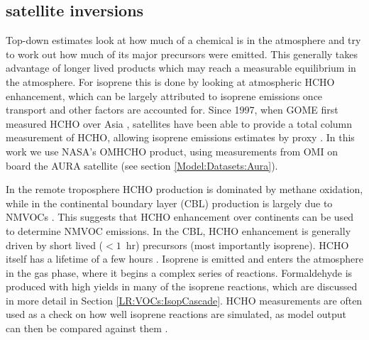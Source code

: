   \subsection{satellite inversions}
    \label{BioIsop:intro:satellite_inversion}
    Top-down estimates look at how much of a chemical is in the atmosphere and try to work out how much of its major precursors were emitted.
    This generally takes advantage of longer lived products which may reach a measurable equilibrium in the atmosphere.
    For isoprene this is done by looking at atmospheric HCHO enhancement, which can be largely attributed to isoprene emissions once transport and other factors are accounted for.
    Since 1997, when GOME first measured HCHO over Asia \parencite{Thomas1998}, satellites have been able to provide a total column measurement of HCHO, allowing isoprene emissions estimates by proxy \parencite{Palmer2001,Bauwens2016}.
    In this work we use NASA's OMHCHO product, using measurements from OMI on board the AURA satellite (see section \ref{Model:Datasets:Aura}).
    
    In the remote troposphere HCHO production is dominated by methane oxidation, while in the continental boundary layer (CBL) production is largely due to NMVOCs \parencite{Abbot2003, Kefauver2014}.
    This suggests that HCHO enhancement over continents can be used to determine NMVOC emissions.
    In the CBL, HCHO enhancement is generally driven by short lived ($<1$~hr) precursors (most importantly isoprene).
    HCHO itself has a lifetime of a few hours \parencite{Kefauver2014}.
    Isoprene is emitted and enters the atmosphere in the gas phase, where it begins a complex series of reactions.
    Formaldehyde is produced with high yields in many of the isoprene reactions, which are discussed in more detail in Section \ref{LR:VOCs:IsopCascade}.
    HCHO measurements are often used as a check on how well isoprene reactions are simulated, as model output can then be compared against them \parencite{Marvin2017}.
    
